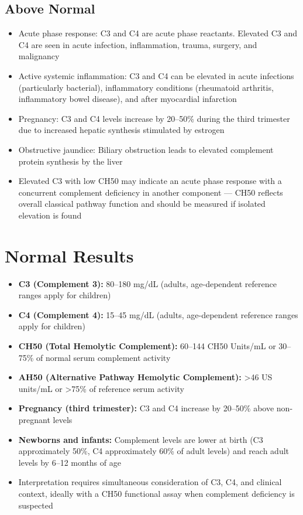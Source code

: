 \subsection*{Above Normal}
\begin{itemize}
  \item Acute phase response: C3 and C4 are acute phase reactants. Elevated C3 and C4 are seen in acute infection, inflammation, trauma, surgery, and malignancy
  \item Active systemic inflammation: C3 and C4 can be elevated in acute infections (particularly bacterial), inflammatory conditions (rheumatoid arthritis, inflammatory bowel disease), and after myocardial infarction
  \item Pregnancy: C3 and C4 levels increase by 20--50\% during the third trimester due to increased hepatic synthesis stimulated by estrogen
  \item Obstructive jaundice: Biliary obstruction leads to elevated complement protein synthesis by the liver
  \item Elevated C3 with low CH50 may indicate an acute phase response with a concurrent complement deficiency in another component --- CH50 reflects overall classical pathway function and should be measured if isolated elevation is found
\end{itemize}

\section*{Normal Results}
\begin{itemize}
  \item \textbf{C3 (Complement 3):} 80--180 mg/dL (adults, age-dependent reference ranges apply for children)
  \item \textbf{C4 (Complement 4):} 15--45 mg/dL (adults, age-dependent reference ranges apply for children)
  \item \textbf{CH50 (Total Hemolytic Complement):} 60--144 CH50 Units/mL or 30--75\% of normal serum complement activity
  \item \textbf{AH50 (Alternative Pathway Hemolytic Complement):} >46 US units/mL or >75\% of reference serum activity
  \item \textbf{Pregnancy (third trimester):} C3 and C4 increase by 20--50\% above non-pregnant levels
  \item \textbf{Newborns and infants:} Complement levels are lower at birth (C3 approximately 50\%, C4 approximately 60\% of adult levels) and reach adult levels by 6--12 months of age
  \item Interpretation requires simultaneous consideration of C3, C4, and clinical context, ideally with a CH50 functional assay when complement deficiency is suspected
\end{itemize}

